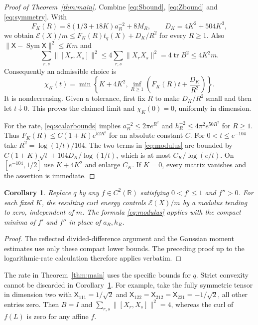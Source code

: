 \documentclass[11pt,reqno]{amsart}
\numberwithin{equation}{section}
\newtheorem{corollary}[theorem]{Corollary}
\theoremstyle{remark}
\newcommand{\R}{\mathbb R}
\newcommand{\X}{\mathsf X}
\DeclareMathOperator{\tr}{tr}
\DeclareMathOperator{\Sym}{Sym}
\begin{document}
\begin{proof}[Proof of Theorem~\ref{thm:main}]
Combine \eqref{eq:Sbound}, \eqref{eq:Zbound} and
\eqref{eq:symmetry}. With
\[
 F_K(R)=8(1/3+18K)a_R^{-2}+8M_R,\qquad D_K=4K^2+504K^3,
\]
we obtain $\mathcal E(X)/m\le F_K(R)t_q(X)+D_K/R^2$ for every $R\ge1$.
Also $\|\X-\Sym\X\|^2\le Km$ and
\[
 \sum_{r,s}\|[X_r,X_s]\|^2
 \le4\sum_{r,s}\|X_rX_s\|^2=4\tr B^2\le4K^2m.
\]
Consequently an admissible choice is
\begin{equation}\label{eq:modulus}
 \chi_K(t)=\min\left\{K+4K^2,
       \inf_{R\ge1}\left(F_K(R)t+\frac{D_K}{R^2}\right)\right\}.
\end{equation}
It is nondecreasing. Given a tolerance, first fix $R$ to make
$D_K/R^2$ small and then let $t\downarrow0$. This proves the claimed
limit and $\chi_K(0)=0$, uniformly in dimension.

For the rate, \eqref{eq:scalarbounds} implies
$a_R^{-2}\le2\pi e^{R^2}$ and $h_R^{-2}\le4\pi^2e^{50R^2}$ for $R\ge1$.
Thus $F_K(R)\le C(1+K)e^{52R^2}$ for an absolute constant $C$.
For $0<t\le e^{-104}$ take $R^2=\log(1/t)/104$. The two terms in
\eqref{eq:modulus} are bounded by
$C(1+K)\sqrt t+104D_K/\log(1/t)$, which is at most
$C_K/\log(e/t)$. On $[e^{-104},1/2]$ use $K+4K^2$ and enlarge $C_K$.
If $K=0$, every matrix vanishes and the assertion is immediate.
\end{proof}

\begin{corollary}\label{cor:general}
Replace $q$ by any $f\in C^2(\R)$ satisfying $0<f'\le1$ and $f''>0$.
For each fixed $K$, the resulting curl energy controls
$\mathcal E(X)/m$ by a modulus tending to zero, independent of $m$.
The formula \eqref{eq:modulus} applies with the compact minima of $f'$
and $f''$ in place of $a_R,h_R$.
\end{corollary}
\begin{proof}
The reflected divided-difference argument and the Gaussian moment
estimates use only these compact lower bounds. The preceding proof up
to the logarithmic-rate calculation therefore applies verbatim.
\end{proof}
The rate in Theorem~\ref{thm:main} uses the specific bounds for $q$.
Strict convexity cannot be discarded in Corollary~\ref{cor:general}.
For example, take the fully symmetric tensor in dimension two with
$\X_{111}=1/\sqrt2$ and
$\X_{122}=\X_{212}=\X_{221}=-1/\sqrt2$, all other entries zero.
Then $B=I$ and $\sum_{r,s}\|[X_r,X_s]\|^2=4$, whereas the curl of
$f(L)$ is zero for any affine $f$.
\end{document}
